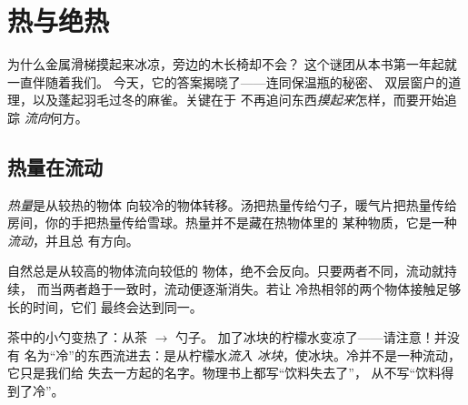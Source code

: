 \chapter{热与绝热}\label{ch:g5:heat-and-insulation}

为什么金属滑梯摸起来冰凉，旁边的木长椅却不会？
这个谜团从本书第一年起就一直伴随着我们。
今天，它的答案揭晓了——连同保温瓶的秘密、
双层窗户的道理，以及蓬起羽毛过冬的麻雀。关键在于
不再追问东西\emph{摸起来}怎样，而要开始追踪
\emph{流向}何方。

\section{热量在流动}

\begin{definition}[热量]\label{def:g5:heat-and-insulation:heat}
\emph{热量}是从较热的物体
向较冷的物体转移。汤把热量传给勺子，暖气片把热量传给
房间，你的手把热量传给雪球。热量并不是藏在热物体里的
某种物质，它是一种\emph{流动}，并且总
有方向。
\end{definition}

\begin{proposition}[热量向低处流]\label{prop:g5:heat-and-insulation:downhill}
自然总是从较高的物体流向较低的
物体，绝不会反向。只要两者不同，流动就持续，
而当两者趋于一致时，流动便逐渐消失。若让
冷热相邻的两个物体接触足够长的时间，它们
最终会达到同一。
\end{proposition}

\begin{example}[判断热量的方向]\label{ex:g5:heat-and-insulation:direction}
茶中的小勺变热了：从茶 $\to$ 勺子。
加了冰块的柠檬水变凉了——请注意！并没有
名为“冷”的东西流进去：是从柠檬水\emph{流入
冰块}，使冰块。冷并不是一种流动，它只是我们给
失去一方起的名字。物理书上都写“饮料失去了”，
从不写“饮料得到了冷”。
\end{example}

